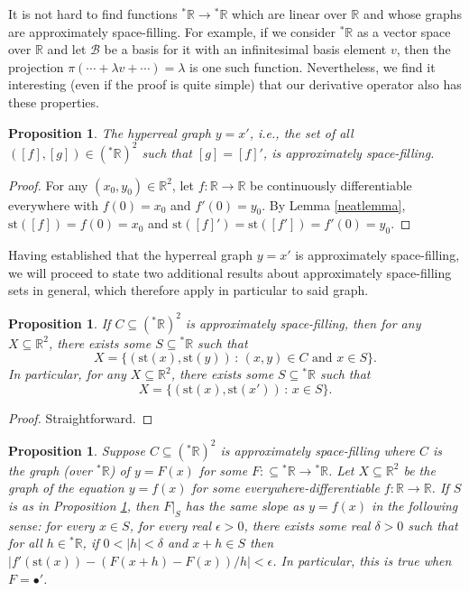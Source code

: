 \documentclass[microtype]{jloganal}
\newtheorem{proposition}[theorem]{Proposition}
\begin{document}
It is not hard to find functions ${}^*\mathbb R\to{}^{*}\mathbb R$
which are linear over $\mathbb R$ and whose graphs are
approximately space-filling. For example, if we consider ${}^*\mathbb R$
as a vector space over $\mathbb R$ and let $\mathcal B$ be a basis for it with
an infinitesimal basis element $v$, then
the projection $\pi(\cdots+\lambda v+\cdots)=\lambda$ is one such function.
Nevertheless, we find it interesting (even if the proof is quite simple)
that our derivative operator also has these properties.

\begin{proposition}
\label{approximatelyspacefillingprop}
    The hyperreal graph $y=x'$, i.e., the set of all $([f],[g])\in({}^*\mathbb R)^2$
    such that $[g]=[f]'$, is approximately space-filling.
\end{proposition}

\begin{proof}
    For any $(x_0,y_0)\in\mathbb R^2$, let $f:\mathbb R\to\mathbb R$
    be continuously differentiable everywhere with $f(0)=x_0$ and $f'(0)=y_0$.
    By Lemma \ref{neatlemma}, $\mathrm{st}([f])=f(0)=x_0$ and
    $\mathrm{st}([f]')=\mathrm{st}([f'])=f'(0)=y_0$.
\end{proof}

Having established that the hyperreal graph $y=x'$ is approximately space-filling,
we will proceed to state two additional results about approximately space-filling
sets in general, which therefore apply in particular to said graph.

\begin{proposition}
\label{shadowprop}
    If $C\subseteq ({}^*\mathbb R)^2$ is approximately space-filling, then
    for any $X\subseteq \mathbb R^2$, there exists some
    $S\subseteq {}^*\mathbb R$ such that
    \[
        X = \{(\mathrm{st}(x),\mathrm{st}(y))\,:\,(x,y)\in C\mbox{ and }x\in S\}.
    \]
    In particular, for any $X\subseteq \mathbb R^2$, there exists some
    $S\subseteq {}^*\mathbb R$ such that
    \[
        X = \{(\mathrm{st}(x),\mathrm{st}(x'))\,:\,x\in S\}.
    \]
\end{proposition}

\begin{proof}
    Straightforward.
\end{proof}

\begin{proposition}
    Suppose $C\subseteq ({}^*\mathbb R)^2$ is approximately space-filling
    where $C$ is the graph (over ${}^*\mathbb R$) of $y=F(x)$ for some
    $F:{\subseteq}{}^*\mathbb R\to{}^*\mathbb R$.
    Let $X\subseteq\mathbb R^2$ be the graph of the equation $y=f(x)$
    for some everywhere-differentiable $f:\mathbb R\to\mathbb R$.
    If $S$ is as in Proposition \ref{shadowprop}, then
    $F|_S$ has the same slope as $y=f(x)$ in the following sense:
    for every $x\in S$, for every real $\epsilon>0$, there exists some
    real $\delta>0$ such that for all $h\in {}^*\mathbb R$, if $0<|h|<\delta$
    and $x+h\in S$ then $|f'(\mathrm{st}(x))-(F(x+h)-F(x))/h|<\epsilon$.
    In particular, this is true when $F=\bullet'$.
\end{proposition}
\end{document}
